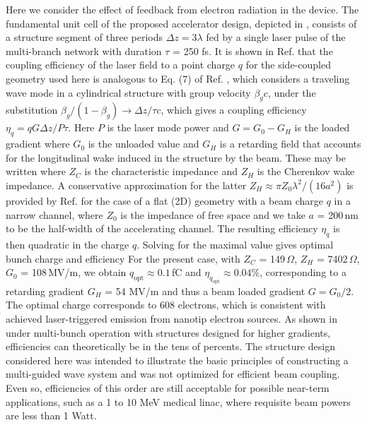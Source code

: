 Here we consider the effect of feedback from electron radiation in the device.
The fundamental unit cell of the proposed accelerator design, depicted in , consists of a structure segment of three periods $\Delta z = 3 \lambda$ fed by a single laser pulse of the multi-branch network with duration $\tau$ = 250 fs.
It is shown in Ref.
 that the coupling efficiency of the laser field to a point charge $q$ for the side-coupled geometry used here is analogous to Eq.
(7) of Ref.
, which considers a traveling wave mode in a cylindrical structure with group velocity $\beta_g c$, under the substitution $\beta_g / (1-\beta_g) \rightarrow \Delta z / \tau c$, which gives a coupling efficiency $\eta_q = q G \Delta z / P \tau$.
 Here $P$ is the laser mode power and $G = G_0 - G_H$ is the loaded gradient where $G_0$ is the unloaded value and $G_H$ is a retarding field that accounts for the longitudinal wake induced in the structure by the beam.
 These may be written
where $Z_C$ is the characteristic impedance and $Z_H$ is the Cherenkov wake impedance.
 A conservative approximation for the latter $Z_H \approx \pi Z_0 \lambda^2 / (16 a^2)$ is provided by Ref.
 for the case of a flat (2D) geometry with a beam charge $q$ in a narrow channel, where $Z_0$ is the impedance of free space and we take $a$ = 200\,nm to be the half-width of the accelerating channel.
 The resulting efficiency $\eta_q$ is then quadratic in the charge $q$.
 Solving for the maximal value gives optimal bunch charge and efficiency
For the present case, with $Z_C$ = 149\,$\Omega$, $Z_H$ = 7402\,$\Omega$, $G_0$ = 108\,MV/m, we obtain $q_\text{opt} \approx 0.1$\,fC and $\eta_{q_\text{opt}} \approx 0.04 \%$, corresponding to a retarding gradient  $G_H$ = 54 MV/m and thus a beam loaded gradient $G = G_0/2$.
The optimal charge corresponds to 608 electrons, which is consistent with achieved laser-triggered emission from nanotip electron sources.
As shown in \cite{Siemann:PRSTB05} under multi-bunch operation with structures designed for higher gradients, efficiencies can theoretically be in the tens of percents.
The structure design considered here was intended to illustrate the basic principles of constructing a multi-guided wave system and was not optimized for efficient beam coupling.
Even so, efficiencies of this order are still acceptable for possible near-term applications, such as a 1 to 10 MeV medical linac, where requisite beam powers are less than 1 Watt.
 
